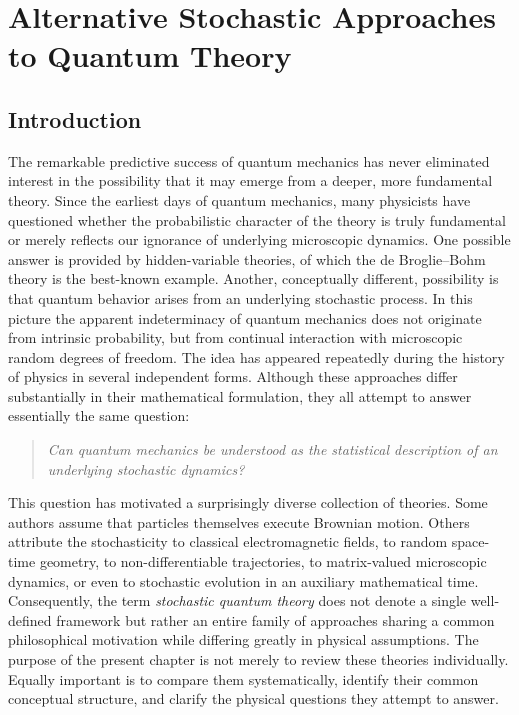 \chapter{Alternative Stochastic Approaches to Quantum Theory}
\label{ch:AlternativeStochastic}
\section{Introduction}
The remarkable predictive success of quantum mechanics has never
eliminated interest in the possibility that it may emerge from a deeper,
more fundamental theory. Since the earliest days of quantum mechanics,
many physicists have questioned whether the probabilistic character of
the theory is truly fundamental or merely reflects our ignorance of
underlying microscopic dynamics.
One possible answer is provided by hidden-variable theories, of which
the de Broglie--Bohm theory is the best-known example. Another,
conceptually different, possibility is that quantum behavior arises from
an underlying stochastic process. In this picture the apparent
indeterminacy of quantum mechanics does not originate from intrinsic
probability, but from continual interaction with microscopic random
degrees of freedom.
The idea has appeared repeatedly during the history of physics in
several independent forms. Although these approaches differ
substantially in their mathematical formulation, they all attempt to
answer essentially the same question:
\begin{quote}
\emph{Can quantum mechanics be understood as the statistical description
of an underlying stochastic dynamics?}
\end{quote}
This question has motivated a surprisingly diverse collection of
theories.
Some authors assume that particles themselves execute Brownian motion.
Others attribute the stochasticity to classical electromagnetic fields,
to random space-time geometry, to non-differentiable trajectories, to
matrix-valued microscopic dynamics, or even to stochastic evolution in
an auxiliary mathematical time.
Consequently, the term \emph{stochastic quantum theory} does not denote
a single well-defined framework but rather an entire family of
approaches sharing a common philosophical motivation while differing
greatly in physical assumptions.
The purpose of the present chapter is not merely to review these
theories individually. Equally important is to compare them
systematically, identify their common conceptual structure, and clarify
the physical questions they attempt to answer.
